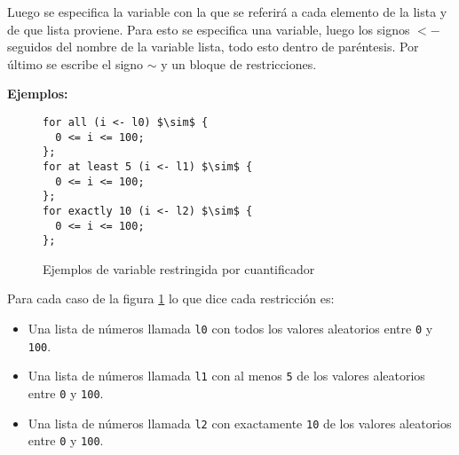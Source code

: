 Luego se especifica la variable con la que se referirá a cada elemento de la lista 
y de que lista proviene. Para esto se especifica una variable, luego los signos
\texttt{$<-$} seguidos del nombre de  la variable lista, todo esto dentro de  
paréntesis. Por último se escribe el signo \texttt{$\sim$} y un bloque de 
restricciones.	
	
\textbf{Ejemplos:}
\begin{figure}[h]
\begin{lstlisting}[mathescape]
for all (i <- l0) $\sim$ {
  0 <= i <= 100;
};
for at least 5 (i <- l1) $\sim$ {
  0 <= i <= 100;
};
for exactly 10 (i <- l2) $\sim$ {
  0 <= i <= 100;
};
\end{lstlisting}
\caption[Ejemplos de variable restringida por cuantificador]
{Ejemplos de variable restringida por cuantificador}
\label{ejemplo_variable_por_cuantificador}
\end{figure}

Para cada caso de la figura \ref{ejemplo_variable_por_cuantificador} lo que dice 
cada restricción es:
\begin{itemize}
 \item {Una lista de números llamada \texttt{l0} con todos los valores aleatorios entre \texttt{0} y \texttt{100}.} 
 \item {Una lista de números llamada \texttt{l1} con al menos \texttt{5} de los valores aleatorios  entre \texttt{0} y \texttt{100}.}
 \item {Una lista de números llamada \texttt{l2} con exactamente \texttt{10} de los valores aleatorios entre \texttt{0} y \texttt{100}.}
\end{itemize}
